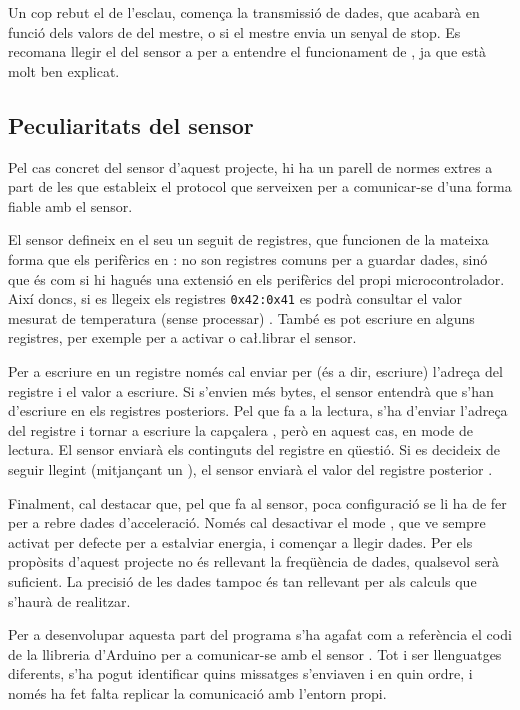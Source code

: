 Un cop rebut el  de l'esclau, comença la transmissió de
dades, que acabarà en funció dels valors de  del mestre, o
si el mestre envia un senyal de stop. Es recomana llegir el  del
sensor a \cite{mpu6050specs} per a entendre el funcionament de ,
ja que està molt ben explicat.

\subsection{Peculiaritats del sensor }
\label{subsec:i2c_sensor}

Pel cas concret del sensor d'aquest projecte, hi ha un parell de normes extres
a part de les que estableix el protocol  que serveixen per a comunicar-se
d'una forma fiable amb el sensor.

El sensor  defineix en el seu  un seguit de
registres, que funcionen de la mateixa forma que els perifèrics en :
no son registres comuns per a guardar dades, sinó que és com si hi hagués una
extensió en els perifèrics del propi microcontrolador. Així doncs, si es llegeix
els registres \texttt{0x42:0x41} es podrà consultar el valor mesurat de temperatura
(sense processar) \cite{MPU6050reg}. També es pot escriure en alguns registres,
per exemple per a activar o ca\l.librar el sensor.

Per a escriure en un registre només cal enviar per  (és a dir, escriure)
l'adreça del registre i el valor a escriure. Si s'envien més bytes, el sensor
entendrà que s'han d'escriure en els registres posteriors. Pel que fa a la lectura,
s'ha d'enviar l'adreça del registre i tornar a escriure la capçalera ,
però en aquest cas, en mode de lectura. El sensor enviarà els continguts del
registre en qüestió. Si es decideix de seguir llegint (mitjançant un ),
el sensor enviarà el valor del registre posterior \cite{mpu6050specs}.

Finalment, cal destacar que, pel que fa al sensor, poca configuració se li ha de
fer per a rebre dades d'acceleració. Només cal desactivar el mode ,
que ve sempre activat per defecte per a estalviar energia, i començar a llegir
dades. Per els propòsits d'aquest projecte no és rellevant la freqüència de
dades, qualsevol serà suficient. La precisió de les dades tampoc és tan rellevant
per als calculs que s'haurà de realitzar.

Per a desenvolupar aquesta part del programa s'ha agafat com a referència el
codi de la llibreria d'Arduino per a comunicar-se amb el sensor
\cite{mpu6050ino}. Tot i ser llenguatges diferents, s'ha pogut identificar
quins missatges  s'enviaven i en quin ordre, i només ha fet falta
replicar la comunicació amb l'entorn propi.

